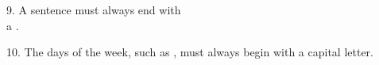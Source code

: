 \documentclass[12pt]{article}
\begin{document}
9. A sentence must always end with \\a \underline{\hspace{4cm}}.

\vspace{3cm}

10. The days of the week, such as \underline{\hspace{4cm}}, must always begin with a capital letter.

\vspace{3cm}





\end{document}
